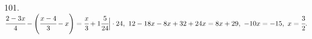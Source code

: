 101. $\cfrac{2-3x}{4}-\left(\cfrac{x-4}{3}-x\right)=\cfrac{x}{3}+1\cfrac{5}{24}\Big|\cdot24,\ 12-18x-8x+32+24x=8x+29,\ -10x=-15,\ x=\cfrac{3}{2}.$\\
